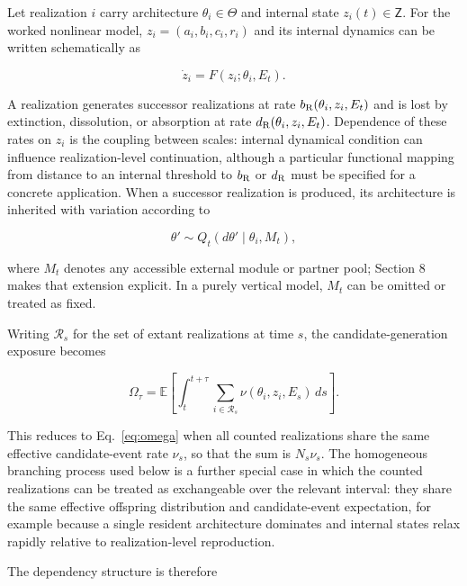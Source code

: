 \documentclass[11pt,a4paper]{article}
\begin{document}
Let realization $i$ carry architecture $\theta_i\in\mathsf\Theta$ and internal state $z_i(t)\in\mathsf Z$. For the worked nonlinear model, $z_i=(a_i,b_i,c_i,r_i)$ and its internal dynamics can be written schematically as

\begin{equation}
\dot z_i=F(z_i;\theta_i,E_t).
\label{eq:two-scale-internal}
\end{equation}

A realization generates successor realizations at rate $b_{\rm R}(\theta_i,z_i,E_t)$ and is lost by extinction, dissolution, or absorption at rate $d_{\rm R}(\theta_i,z_i,E_t)$. Dependence of these rates on $z_i$ is the coupling between scales: internal dynamical condition can influence realization-level continuation, although a particular functional mapping from distance to an internal threshold to $b_{\rm R}$ or $d_{\rm R}$ must be specified for a concrete application. When a successor realization is produced, its architecture is inherited with variation according to

\begin{equation}
\theta'\sim Q_t(d\theta'\mid\theta_i,M_t),
\label{eq:two-scale-inheritance}
\end{equation}

where $M_t$ denotes any accessible external module or partner pool; Section 8 makes that extension explicit. In a purely vertical model, $M_t$ can be omitted or treated as fixed.

Writing $\mathcal R_s$ for the set of extant realizations at time $s$, the candidate-generation exposure becomes

\begin{equation}
\boxed{
\Omega_\tau
=
\mathbb E\!\left[
\int_t^{t+\tau}
\sum_{i\in\mathcal R_s}
\nu(\theta_i,z_i,E_s)\,ds
\right].
}
\label{eq:omega-two-scale}
\end{equation}

This reduces to Eq.~\eqref{eq:omega} when all counted realizations share the same effective candidate-event rate $\nu_s$, so that the sum is $N_s\nu_s$. The homogeneous branching process used below is a further special case in which the counted realizations can be treated as exchangeable over the relevant interval: they share the same effective offspring distribution and candidate-event expectation, for example because a single resident architecture dominates and internal states relax rapidly relative to realization-level reproduction.

The dependency structure is therefore
\end{document}
